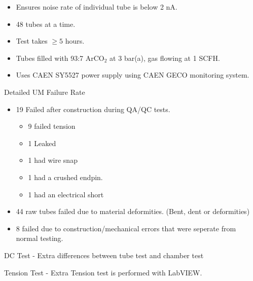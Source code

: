 	\begin{frame}{}
		\begin{itemize}
			\item Ensures noise rate of individual tube is below 2 nA.
			\item 48 tubes at a time.
			\item Test takes $\geq5$ hours.
			\item Tubes filled with 93:7 ArCO$_2$ at 3 bar(a), gas flowing at 1 SCFH. 
			\item Uses CAEN SY5527 power supply using CAEN GECO monitoring system.
		\end{itemize}
	\end{frame}
	\begin{frame}{Detailed UM Failure Rate}
		\begin{itemize}
			\item 19 Failed after construction during QA/QC tests. 
			\begin{itemize}
				\item 9 failed tension 
				\item 1 Leaked
				\item 1 had wire snap
				\item 1 had a crushed endpin.
				\item 1 had an electrical short
			\end{itemize}
			\item 44 raw tubes failed due to material deformities. (Bent, dent or deformities)
			\item 8 failed due to construction/mechanical errors that were seperate from normal testing.

		\end{itemize}
	\end{frame}
	\begin{frame}{DC Test - Extra}
		differences between tube test and chamber test
	\end{frame}
	\begin{frame}{Tension Test - Extra}
		Tension test is performed with LabVIEW.
	\end{frame}